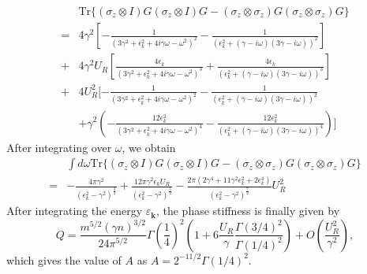 \documentclass[aps,onecolumn,superscriptaddress,notitlepage,longbibliography]{revtex4-1}
\begin{document}
\begin{align}
 & \mathrm{Tr}\{(\sigma_{z}\otimes I)G(\sigma_{z}\otimes I)G-(\sigma_{z}\otimes\sigma_{z})G(\sigma_{z}\otimes\sigma_{z})G\}\nonumber \\
= & 4\gamma^{2}[-\frac{1}{(3\gamma^{2}+\epsilon_{k}^{2}+4i\gamma\omega-\omega^{2})^{2}}-\frac{1}{(\epsilon_{k}^{2}+(\gamma-i\omega)(3\gamma-i\omega))^{2}}]\nonumber \\
+ & 4\gamma^{2}U_{R}[\frac{4\epsilon_{k}}{(3\gamma^{2}+\epsilon_{k}^{2}+4i\gamma\omega-\omega^{2})^{3}}+\frac{4\epsilon_{k}}{(\epsilon_{k}^{2}+(\gamma-i\omega)(3\gamma-i\omega))^{3}}]\nonumber \\
+ & 4U_{R}^{2}[-\frac{1}{(3\gamma^{2}+\epsilon_{k}^{2}+4i\gamma\omega-\omega^{2})^{2}}-\frac{1}{(\epsilon_{k}^{2}+(\gamma-i\omega)(3\gamma-i\omega))^{2}}\nonumber \\
 & +\gamma^{2}(-\frac{12\epsilon_{k}^{2}}{(3\gamma^{2}+\epsilon_{k}^{2}+4i\gamma\omega-\omega^{2})^{4}}-\frac{12\epsilon_{k}^{2}}{(\epsilon_{k}^{2}+(\gamma-i\omega)(3\gamma-i\omega))^{4}})]
\end{align}
After integrating over $\omega$, we obtain 
\begin{align}
 & \int d\omega\mathrm{Tr}\{(\sigma_{z}\otimes I)G(\sigma_{z}\otimes I)G-(\sigma_{z}\otimes\sigma_{z})G(\sigma_{z}\otimes\sigma_{z})G\}\nonumber \\
= & -\frac{4\pi\gamma^{2}}{(\epsilon_{k}^{2}-\gamma^{2})^{\frac{3}{2}}}+\frac{12\pi\gamma^{2}\epsilon_{k}U_{R}}{(\epsilon_{k}^{2}-\gamma^{2})^{\frac{5}{2}}}-\frac{2\pi(2\gamma^{4}+11\gamma^{2}\epsilon_{k}^{2}+2\epsilon_{k}^{4})}{(\epsilon_{k}^{2}-\gamma^{2})^{\frac{7}{2}}}U_{R}^{2}
\end{align}
After integrating the energy $\varepsilon_{\mathbf{k}}$, the phase stiffness is finally given by
\begin{equation}
	Q=\frac{m^{5/2}(\gamma n)^{3/2}}{24\pi^{5/2}}\Gamma\left(\frac{1}{4}\right)^2\left(1+6\frac{U_R}{\gamma}\frac{\Gamma(3/4)^2}{\Gamma(1/4)^2}\right)+O(\frac{U_R^2}{\gamma^2}),
\end{equation}
which gives the value of $A$ as $A=2^{-11/2}\Gamma(1/4)^2$.
\end{document}
